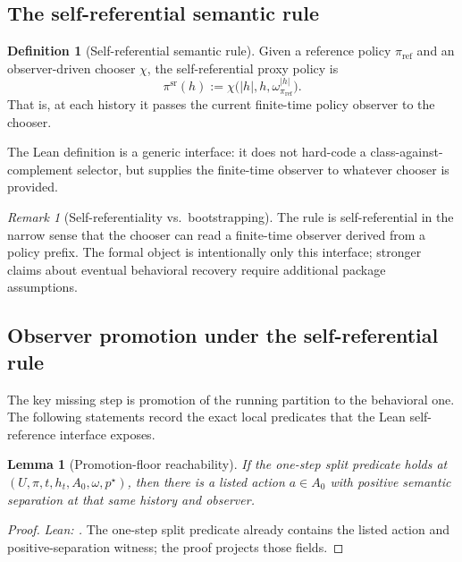 \documentclass[11pt]{article}
\newtheorem{lemma}[theorem]{Lemma}
\theoremstyle{definition}
\newtheorem{definition}[theorem]{Definition}
\theoremstyle{remark}
\newtheorem{remark}[theorem]{Remark}
\theoremstyle{plain}
\theoremstyle{definition}
\begin{document}
\subsection{The self-referential semantic rule}
\label{sec:self-ref-rule}

\begin{definition}[Self-referential semantic rule]
\label{def:self-ref-rule}
Given a reference policy $\pi_{\mathrm{ref}}$ and an observer-driven chooser $\chi$, the self-referential proxy policy is
\[
\pi^{\mathrm{sr}}(h)
:=
\chi\bigl(|h|,h,\omega_{\pi_{\mathrm{ref}}}^{|h|}\bigr).
\]
That is, at each history it passes the current finite-time policy observer to the chooser.
\end{definition}

The Lean definition is a generic interface: it does not hard-code a class-against-complement selector, but supplies the finite-time observer to whatever chooser is provided.

\begin{remark}[Self-referentiality vs.\ bootstrapping]
\label{rem:self-reference-scope}
The rule is self-referential in the narrow sense that the chooser can read a finite-time observer derived from a policy prefix. The formal object is intentionally only this interface; stronger claims about eventual behavioral recovery require additional package assumptions.
\end{remark}

\subsection{Observer promotion under the self-referential rule}
\label{sec:observer-promotion-sr}

The key missing step is promotion of the running partition to the behavioral one. The following statements record the exact local predicates that the Lean self-reference interface exposes.

\begin{lemma}[Promotion-floor reachability]
\label{lem:exploration-reachability}
If the one-step split predicate holds at $(U,\pi,t,h_t,A_0,\omega,p^\star)$, then there is a listed action $a\in A_0$ with positive semantic separation at that same history and observer.
\end{lemma}

\begin{proof}
\noindent\emph{Lean: .}
The one-step split predicate already contains the listed action and positive-separation witness; the proof projects those fields.
\end{proof}
\end{document}
